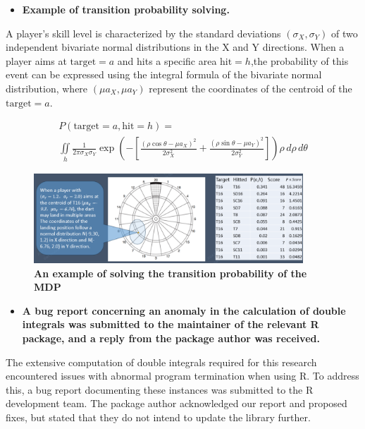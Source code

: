 \documentclass[cjjs]{ipart}
\theoremstyle{plain}
\begin{document}
\begin{itemize}
    \item \textbf{Example of transition probability solving.}
\end{itemize}

\text A player's skill level is characterized by the standard deviations
$(\sigma_X, \sigma_Y)$ of two independent bivariate normal distributions in the X and Y directions. When a player aims at ${\text{target}} = a$ and hits a specific area $\text{hit} = h$,the probability of this event can be expressed using the integral formula of the bivariate normal distribution, where $(\mu a_X, \mu a_Y)$ represent the coordinates of the centroid of the $\text{target} = a$.
    
\begin{multline*}
P(\text{target} = a, \text{hit} = h) =\\
\iint\limits_h \frac{1}{2 \pi \sigma_X \sigma_Y} 
\exp\left( - \left[ \frac{(\rho \cos \theta - \mu a_X)^2}{2 \sigma_X^2} 
+ \frac{(\rho \sin \theta - \mu a_Y)^2}{2 \sigma_Y^2} \right] \right) 
\rho \, d\rho \, d\theta
\end{multline*}

\begin{figure}[H]
    \centering
    \includegraphics[width=0.90\textwidth]{10.png} 
    \caption{\textbf{An example of solving the transition probability
of the MDP}}
    \label{fig:dartboard}
\end{figure}

\begin{itemize}
    \item \textbf{A bug report concerning an anomaly in the calculation of double integrals was submitted to the maintainer of the relevant R package, and a reply from the package author was received.}
\end{itemize}

\text The extensive computation of double integrals required for this research encountered issues with abnormal program termination when using R. To address this, a bug report documenting these instances was submitted to the R development team. The package author acknowledged our report and proposed fixes, but stated that they do not intend to update the library further.
\end{document}
